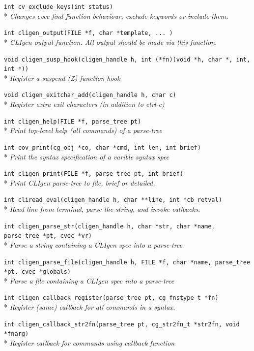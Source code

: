 \documentclass[a4paper, 10pt] {article}
\begin{document}
{{\tt int cv\_exclude\_keys(int status)}\\*
\emph{ Changes cvec find function behaviour, exclude keywords or include them.}

{\tt int cligen\_output(FILE *f, char *template, ... )}\\*
\emph{ CLIgen output function. All output should be made via this function.}

{\tt void cligen\_susp\_hook(cligen\_handle h, int (*fn)(void *h, char *, int, int *))}\\*
\emph{ Register a suspend (\^Z) function hook }

{\tt void cligen\_exitchar\_add(cligen\_handle h, char c)}\\*
\emph{ Register extra exit characters (in addition to ctrl-c)}

{\tt int cligen\_help(FILE *f, parse\_tree pt)}\\*
\emph{ Print top-level help (all commands) of a parse-tree}

{\tt int cov\_print(cg\_obj *co, char *cmd, int len, int brief)}\\*
\emph{ Print the syntax specification of a varible syntax spec}

{\tt int cligen\_print(FILE *f, parse\_tree pt, int brief)}\\*
\emph{  Print CLIgen parse-tree to file, brief or detailed.}

{\tt int cliread\_eval(cligen\_handle h, char **line, int *cb\_retval)}\\*
\emph{ Read line from terminal, parse the string, and invoke callbacks.}

{\tt int cligen\_parse\_str(cligen\_handle h, char *str, char *name, parse\_tree *pt, cvec *vr)}\\*
\emph{ Parse a string containing a CLIgen spec into a parse-tree}

{\tt int cligen\_parse\_file(cligen\_handle h, FILE *f, char *name, parse\_tree *pt, cvec *globals)}\\*
\emph{ Parse a file containing a CLIgen spec into a parse-tree}

{\tt int cligen\_callback\_register(parse\_tree pt, cg\_fnstype\_t *fn)}\\*
\emph{  Register (same) callback for all commands in a syntax.}

{\tt int cligen\_callback\_str2fn(parse\_tree pt, cg\_str2fn\_t *str2fn, void *fnarg)}\\*
\emph{  Register callback for commands using callback function}

}
\end{document}
